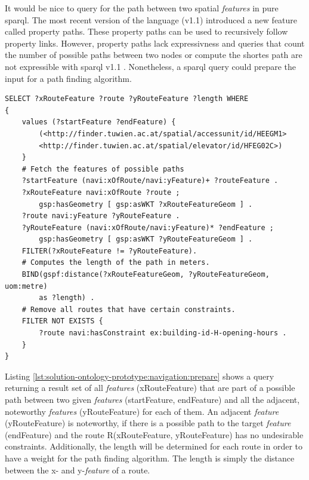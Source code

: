 \documentclass[draft,final]{vutinfth} %
\begin{document}
It would be nice to query for the path between two spatial \textit{features} in pure \gls{sparql}. The most recent version of the language (v1.1) introduced a new feature called property paths. These property paths can be used to recursively follow property links\cite{harris_sparql_2013}. However, property paths lack expressivness and queries that count the number of possible paths between two nodes or compute the shortes path are not expressible with \gls{sparql} v1.1 \cite{reutter_recursion_2015}\cite{atzori_computing_2014}. Nonetheless, a \gls{sparql} query could prepare the input for a path finding algorithm. 

\begin{lstlisting}[language=sparql, frame=single, basicstyle=\footnotesize, caption=Prepare for path finding, label={lst:solution-ontology-prototype:navigation:prepare}]
SELECT ?xRouteFeature ?route ?yRouteFeature ?length WHERE
{
    values (?startFeature ?endFeature) {
    	(<http://finder.tuwien.ac.at/spatial/accessunit/id/HEEGM1> 
    	<http://finder.tuwien.ac.at/spatial/elevator/id/HFEG02C>)
    }
    # Fetch the features of possible paths
    ?startFeature (navi:xOfRoute/navi:yFeature)+ ?routeFeature .
    ?xRouteFeature navi:xOfRoute ?route ;
    	gsp:hasGeometry [ gsp:asWKT ?xRouteFeatureGeom ] .
    ?route navi:yFeature ?yRouteFeature .
    ?yRouteFeature (navi:xOfRoute/navi:yFeature)* ?endFeature ;
      	gsp:hasGeometry [ gsp:asWKT ?yRouteFeatureGeom ] .
    FILTER(?xRouteFeature != ?yRouteFeature).
    # Computes the length of the path in meters.
    BIND(gspf:distance(?xRouteFeatureGeom, ?yRouteFeatureGeom, uom:metre)
    	as ?length) .
    # Remove all routes that have certain constraints.
    FILTER NOT EXISTS {
    	?route navi:hasConstraint ex:building-id-H-opening-hours .
    }
}
\end{lstlisting}

Listing \ref{lst:solution-ontology-prototype:navigation:prepare} shows a query returning a result set of all \textit{features} (xRouteFeature) that are part of a possible path between two given \textit{features} (startFeature, endFeature) and all the adjacent, noteworthy \textit{features} (yRouteFeature) for each of them. An adjacent \textit{feature} (yRouteFeature) is noteworthy, if there is a possible path to the target \textit{feature} (endFeature) and the route R(xRouteFeature, yRouteFeature) has no undesirable constraints. Additionally, the length will be determined for each route in order to have a weight for the path finding algorithm. The length is simply the distance between the x- and y-\textit{feature} of a route.
\end{document}
